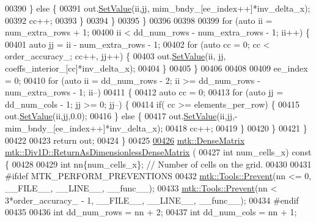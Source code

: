 \begin{DoxyCode}
{{00390       \} \textcolor{keywordflow}{else} \{
00391         out.\hyperlink{classmtk_1_1DenseMatrix_a784ce5784109ac86bfb9d8562b334b13}{SetValue}(ii,jj, mim\_bndy\_[ee\_index++]*inv\_delta\_x);
00392         cc++;
00393       \}
00394     \}
00395   \}
00396 
00398 
00399   \textcolor{keywordflow}{for} (\textcolor{keyword}{auto} ii = num\_extra\_rows + 1;
00400        ii < dd\_num\_rows - num\_extra\_rows - 1; ii++) \{
00401     \textcolor{keyword}{auto} jj = ii - num\_extra\_rows - 1;
00402     \textcolor{keywordflow}{for} (\textcolor{keyword}{auto} cc = 0; cc < order\_accuracy\_; cc++, jj++) \{
00403       out.\hyperlink{classmtk_1_1DenseMatrix_a784ce5784109ac86bfb9d8562b334b13}{SetValue}(ii, jj, coeffs\_interior\_[cc]*inv\_delta\_x);
00404     \}
00405   \}
00406 
00408 
00409   ee\_index = 0;
00410   \textcolor{keywordflow}{for} (\textcolor{keyword}{auto} ii = dd\_num\_rows - 2; ii >= dd\_num\_rows - num\_extra\_rows - 1; ii--)
00411 \{
00412     \textcolor{keyword}{auto} cc = 0;
00413     \textcolor{keywordflow}{for} (\textcolor{keyword}{auto} jj = dd\_num\_cols - 1; jj >= 0; jj--) \{
00414       \textcolor{keywordflow}{if}( cc >= elements\_per\_row) \{
00415         out.\hyperlink{classmtk_1_1DenseMatrix_a784ce5784109ac86bfb9d8562b334b13}{SetValue}(ii,jj,0.0);
00416       \} \textcolor{keywordflow}{else} \{
00417         out.\hyperlink{classmtk_1_1DenseMatrix_a784ce5784109ac86bfb9d8562b334b13}{SetValue}(ii,jj,-mim\_bndy\_[ee\_index++]*inv\_delta\_x);
00418         cc++;
00419       \}
00420      \}
00421   \}
00422 
00423   \textcolor{keywordflow}{return} out;
00424 \}
00425 
\hypertarget{mtk__div__1d_8cc_source_l00426}{}\hyperlink{classmtk_1_1Div1D_af2546ad1568ef39a6075f03bb395719e}{00426} \hyperlink{classmtk_1_1DenseMatrix}{mtk::DenseMatrix} \hyperlink{classmtk_1_1Div1D_af2546ad1568ef39a6075f03bb395719e}{mtk::Div1D::ReturnAsDimensionlessDenseMatrix}
      (
00427   \textcolor{keywordtype}{int} num\_cells\_x)\textcolor{keyword}{ const }\{
00428 
00429   \textcolor{keywordtype}{int} nn\{num\_cells\_x\}; \textcolor{comment}{// Number of cells on the grid.}
00430 
00431 \textcolor{preprocessor}{  #ifdef MTK\_PERFORM\_PREVENTIONS}
00432   \hyperlink{classmtk_1_1Tools_a332324c6f25e66be9dff48c5987a3b9f}{mtk::Tools::Prevent}(nn <= 0, \_\_FILE\_\_, \_\_LINE\_\_, \_\_func\_\_);
00433   \hyperlink{classmtk_1_1Tools_a332324c6f25e66be9dff48c5987a3b9f}{mtk::Tools::Prevent}(nn < 3*order\_accuracy\_ - 1, \_\_FILE\_\_, \_\_LINE\_\_, \_\_func\_\_);
00434 \textcolor{preprocessor}{  #endif}
00435 
00436   \textcolor{keywordtype}{int} dd\_num\_rows = nn + 2;
00437   \textcolor{keywordtype}{int} dd\_num\_cols = nn + 1;
}}
\end{DoxyCode}
